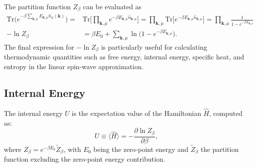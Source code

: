 \documentclass[aps, prx, nofootinbib, superscriptaddress]{revtex4-2}
\newcommand{\kvec}{\mathbf{k}}
\newcommand{\Tr}{\mathrm{Tr}}
\begin{document}
The partition function $Z_{\beta}$ can be evaluated as
\begin{subequations}\label{eq: explicit expressions for Z and log-Z}
    \begin{align}
        \Tr \big( e^{- \beta \sum_{\kvec, \mu} E_{\kvec, \mu} \hat{n}_{\mu}(\kvec)} \big) 
        = & \Tr \Big[ \prod_{\kvec, \mu} e^{- \beta E_{\kvec, \mu} \hat{n}_{\kvec, \mu}} \Big]
        = \prod_{\kvec, \mu} \Tr \Big[ e^{- \beta E_{\kvec, \mu} \hat{n}_{\kvec, \mu}} \Big] 
        =  \prod_{\kvec, \mu}  \frac{1}{1 - e^{- \beta E_{\kvec, \mu}}} \\
        - \ln Z_{\beta} &= \beta E_{0} + \sum_{\kvec, \mu} \ln \big( 1 - e^{- \beta E_{\kvec, \mu}} \big).
    \end{align}
\end{subequations}
The final expression for $-\ln Z_{\beta}$ is particularly useful for calculating thermodynamic quantities such as free energy, internal energy, specific heat, and entropy in the linear spin-wave approximation.


\subsection{Internal Energy}\label{subsec: Internal Energy}
The internal energy $U$ is the expectation value of the Hamiltonian $\hat{H}$, computed as:
\begin{equation}
    U \equiv \langle \hat{H} \rangle  = -\frac{\partial \ln Z_{\beta}}{\partial \beta},
\end{equation}
where $Z_{\beta} = e^{- \beta E_{0}} \tilde{Z}_{\beta}$, with $E_0$ being the zero-point energy and $\tilde{Z}_{\beta}$ the partition function excluding the zero-point energy contribution.
\end{document}
